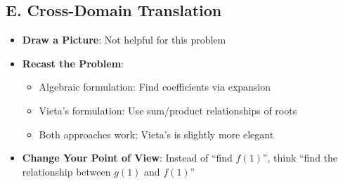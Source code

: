 \documentclass[]{article}
\begin{document}
\begin{strategicbox}
\subsection*{E. Cross-Domain Translation}
\begin{itemize}[leftmargin=*]
    \item \textbf{Draw a Picture}: Not helpful for this problem
    
    \item \textbf{Recast the Problem}: 
    \begin{itemize}
        \item Algebraic formulation: Find coefficients via expansion
        \item Vieta's formulation: Use sum/product relationships of roots
        \item Both approaches work; Vieta's is slightly more elegant
    \end{itemize}
    
    \item \textbf{Change Your Point of View}: Instead of ``find $f(1)$'', think ``find the relationship between $g(1)$ and $f(1)$''
\end{itemize}
\end{strategicbox}
\end{document}
